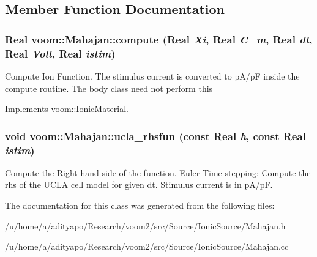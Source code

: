 \subsection{Member Function Documentation}
\hypertarget{classvoom_1_1_mahajan_af69275575333c5b53c6485b090f77041}{
\subsubsection[{compute}]{\setlength{\rightskip}{0pt plus 5cm}Real voom::Mahajan::compute (Real {\em Xi}, \/  Real {\em C\_\-m}, \/  Real {\em dt}, \/  Real {\em Volt}, \/  Real {\em istim})}}
\label{classvoom_1_1_mahajan_af69275575333c5b53c6485b090f77041}
Compute Ion Function. The stimulus current is converted to pA/pF inside the compute routine. The body class need not perform this 

Implements \hyperlink{classvoom_1_1_ionic_material_a1b95cf90af115374b428f2e5ece571cb}{voom::IonicMaterial}.\hypertarget{classvoom_1_1_mahajan_a823f525969c509dc65b22f1f88efe173}{
\subsubsection[{ucla\_\-rhsfun}]{\setlength{\rightskip}{0pt plus 5cm}void voom::Mahajan::ucla\_\-rhsfun (const Real {\em h}, \/  const Real {\em istim})}}
\label{classvoom_1_1_mahajan_a823f525969c509dc65b22f1f88efe173}


Compute the Right hand side of the function. Euler Time stepping: Compute the rhs of the UCLA cell model for given dt. Stimulus current is in pA/pF. 

The documentation for this class was generated from the following files:\begin{DoxyCompactItemize}
\item 
/u/home/a/adityapo/Research/voom2/src/Source/IonicSource/Mahajan.h\item 
/u/home/a/adityapo/Research/voom2/src/Source/IonicSource/Mahajan.cc\end{DoxyCompactItemize}
